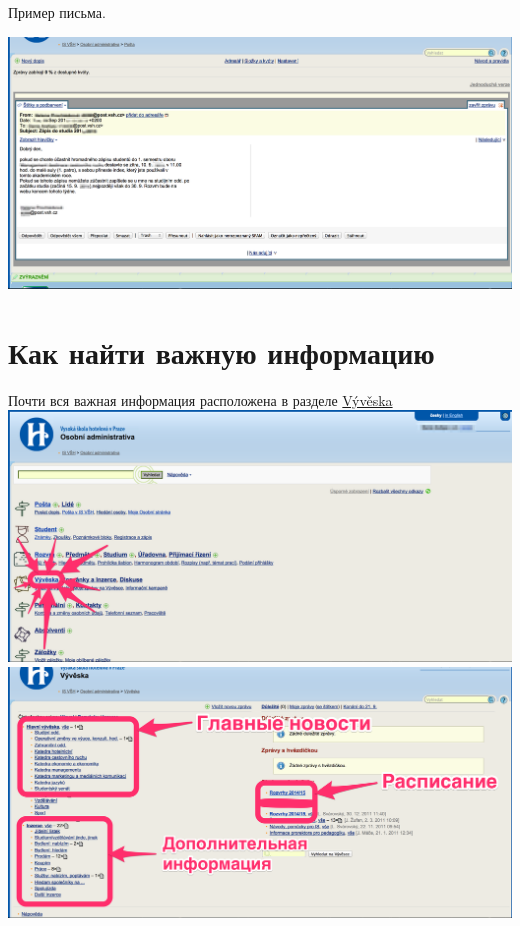 \documentclass[a4paper,12pt]{article}
\begin{document}
Пример письма.

\includegraphics[width=\textwidth]{s10-1}

\newpage

\section{Как найти важную информацию}

Почти вся важная информация расположена в разделе 
\href{https://is.vsh.cz/auth/vyveska/}{Vývěska} \\

\includegraphics[width=\textwidth]{s11} \\

\includegraphics[width=\textwidth]{s12} \\
\end{document}
